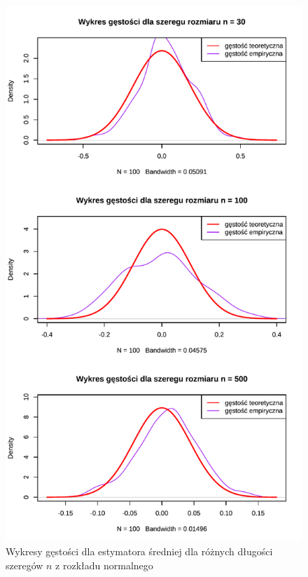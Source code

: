 \documentclass[10pt, a4paper]{article}\usepackage[]{graphicx}\usepackage[]{xcolor}
\makeatletter
\def\maxwidth{ %
  \ifdim\Gin@nat@width>\linewidth
    \linewidth
  \else
    \Gin@nat@width
  \fi
}
\newenvironment{knitrout}{}{} %
\makeatother
\begin{document}
\begin{knitrout}
\color{fgcolor}\begin{figure}[H]

{\centering \includegraphics[width=\maxwidth]{figure/analiza-sredniej-norm-dens-1} 

}

\caption[Wykresy gęstości dla estymatora średniej dla różnych długości szeregów $n$ z rozkładu normalnego]{Wykresy gęstości dla estymatora średniej dla różnych długości szeregów $n$ z rozkładu normalnego}\label{fig:analiza-sredniej-norm-dens}
\end{figure}

\end{knitrout}
\end{document}
